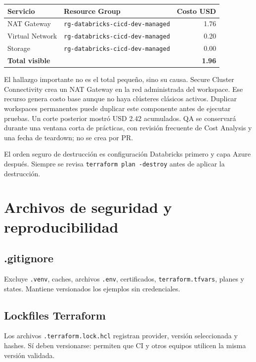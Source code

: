 \documentclass[11pt,a4paper]{article}
\begin{document}
\begin{longtable}{p{}p{}r}
\toprule
\textbf{Servicio} & \textbf{Resource Group} & \textbf{Costo USD} \\
\midrule
\endhead
NAT Gateway & \texttt{rg-databricks-cicd-dev-managed} & 1.76 \\
Virtual Network & \texttt{rg-databricks-cicd-dev-managed} & 0.20 \\
Storage & \texttt{rg-databricks-cicd-dev-managed} & 0.00 \\
\midrule
\textbf{Total visible} & & \textbf{1.96} \\
\bottomrule
\end{longtable}

El hallazgo importante no es el total pequeño, sino su causa. Secure Cluster Connectivity crea un
NAT Gateway en la red administrada del workspace. Ese recurso genera costo base aunque no haya
clústeres clásicos activos. Duplicar workspaces permanentes puede duplicar este componente antes de
ejecutar pruebas. Un corte posterior mostró USD 2.42 acumulados. QA se conservará durante una ventana
corta de prácticas, con revisión frecuente de Cost Analysis y una fecha de teardown; no se crea por PR.

El orden seguro de destrucción es configuración Databricks primero y capa Azure después. Siempre se
revisa \texttt{terraform plan -destroy} antes de aplicar la destrucción.

\section{Archivos de seguridad y reproducibilidad}

\subsection{.gitignore}

Excluye \texttt{.venv}, caches, archivos \texttt{.env}, certificados, \texttt{terraform.tfvars},
planes y states. Mantiene versionados los ejemplos sin credenciales.

\subsection{Lockfiles Terraform}

Los archivos \texttt{.terraform.lock.hcl} registran provider, versión seleccionada y hashes. Sí deben
versionarse: permiten que CI y otros equipos utilicen la misma versión validada.
\end{document}
